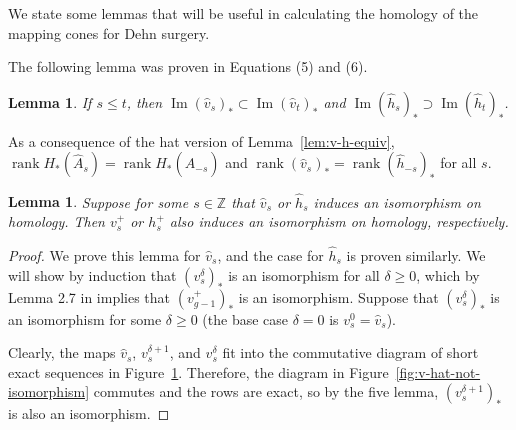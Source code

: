 \documentclass{article}
\newtheorem{lemma}[equation]{Lemma}
\theoremstyle{remark}
\numberwithin{equation}{section}
\numberwithin{table}{section}
\newcommand{\wh}{\widehat}
\DeclareMathOperator{\im}{Im}
\DeclareMathOperator{\rank}{rank}
\renewcommand{\(}{\left(}
\renewcommand{\)}{\right)}
\newcommand{\Z}{{\mathbb{Z}}}
\begin{document}
We state some lemmas that will be useful in calculating the homology of the mapping cones for Dehn surgery. 

The following lemma was proven in \cite{ni-property-g} Equations (5) and (6).

\begin{lemma}
If $s\le t$, then $\im(\wh v_s)_*\subset\im(\wh v_t)_*$ and $\im(\wh h_s)_*\supset\im(\wh h_t)_*$.
\end{lemma}



As a consequence of the hat version of Lemma~\ref{lem:v-h-equiv}, $\rank H_*(\wh A_s)=\rank H_*(\wh A_{-s})$ and $\rank (\wh v_s)_*=\rank(\wh h_{-s})_*$ for all $s$.



\begin{lemma}\label{lem:hat-plus-iso}
Suppose for some $s\in\Z$ that $\wh v_s$ or $\wh h_s$ induces an isomorphism on homology. Then $v_s^+$ or $h_s^+$ also induces an isomorphism on homology, respectively.
\end{lemma}



\begin{proof}
We prove this lemma for $\wh v_s$, and the case for $\wh h_s$ is proven similarly. We will show by induction that $(v_{s}^\delta)_*$ is an isomorphism for all $\delta\ge 0$, which by Lemma 2.7 in \cite{oz-sz-integer} implies that $(v_{g-1}^+)_*$ is an isomorphism. Suppose that $(v_{s}^\delta)_*$ is an isomorphism for some $\delta\ge 0$ (the base case $\delta=0$ is $v_{s}^0=\wh v_{s}$). 

Clearly, the maps $\wh v_s$, $v_s^{\delta+1}$, and $v_s^\delta$ fit into the commutative diagram of short exact sequences in Figure~\ref{fig:v-delta-ses}. 
Therefore, the diagram in Figure~\ref{fig:v-hat-not-isomorphism} commutes and the rows are exact, so by the five lemma, $(v_{s}^{\delta+1})_*$ is also an isomorphism. 
\end{proof}

\begin{figure}[h]
\centering
{}
\caption{}
\label{fig:v-delta-ses}
\end{figure}
\end{document}
